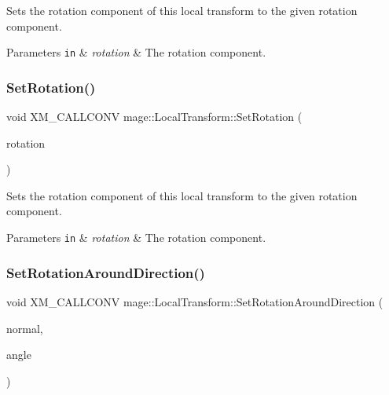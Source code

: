 Sets the rotation component of this local transform to the given rotation component.


\begin{DoxyParams}[1]{Parameters}
\mbox{\tt in}  & {\em rotation} & The rotation component. \\
\hline
\end{DoxyParams}
\hypertarget{classmage_1_1_local_transform_a470961f6e4f3b0920742489722ca791e}{}\label{classmage_1_1_local_transform_a470961f6e4f3b0920742489722ca791e} 
\subsubsection{\texorpdfstring{Set\+Rotation()}{SetRotation()}\hspace{0.1cm}{\footnotesize\ttfamily [3/3]}}
{\footnotesize\ttfamily void X\+M\+\_\+\+C\+A\+L\+L\+C\+O\+NV mage\+::\+Local\+Transform\+::\+Set\+Rotation (\begin{DoxyParamCaption}\item[{F\+X\+M\+V\+E\+C\+T\+OR}]{rotation }\end{DoxyParamCaption})\hspace{0.3cm}{\ttfamily [noexcept]}}

Sets the rotation component of this local transform to the given rotation component.


\begin{DoxyParams}[1]{Parameters}
\mbox{\tt in}  & {\em rotation} & The rotation component. \\
\hline
\end{DoxyParams}
\hypertarget{classmage_1_1_local_transform_a366b1cbd069bce035a868a8800dc04e9}{}\label{classmage_1_1_local_transform_a366b1cbd069bce035a868a8800dc04e9} 
\subsubsection{\texorpdfstring{Set\+Rotation\+Around\+Direction()}{SetRotationAroundDirection()}}
{\footnotesize\ttfamily void X\+M\+\_\+\+C\+A\+L\+L\+C\+O\+NV mage\+::\+Local\+Transform\+::\+Set\+Rotation\+Around\+Direction (\begin{DoxyParamCaption}\item[{F\+X\+M\+V\+E\+C\+T\+OR}]{normal,  }\item[{\hyperlink{namespacemage_aa97e833b45f06d60a0a9c4fc22ae02c0}{F32}}]{angle }\end{DoxyParamCaption})\hspace{0.3cm}{\ttfamily [noexcept]}}

